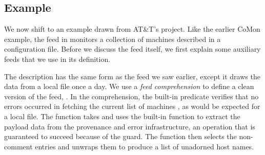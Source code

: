 




\subsection{\vizGems{} Example}
\label{sec:vizgems}
We now shift to an example drawn from AT\&T's \vizGems{} project.  Like
the earlier CoMon example, the  feed in 
monitors a collection of machines described in a configuration file.
Before we discuss the  feed itself, we first explain some
auxiliary feeds that we use in its definition.   

The  description has the same form as the 
feed we saw earlier, except it draws the data from a local file once a
day.  We use a \textit{feed comprehension} to define a clean
version of the feed, .  In the comprehension, the
built-in predicate  verifies that no errors occurred in
fetching the current list of machines , as would be expected
for a local file.  The function  takes  and uses
the built-in function  to extract the payload data from
the provenance and error infrastructure, an operation that is
guaranteed to succeed because of the  guard. The function
 then selects the non-comment entries and unwraps them to
produce a list of unadorned host names.   

